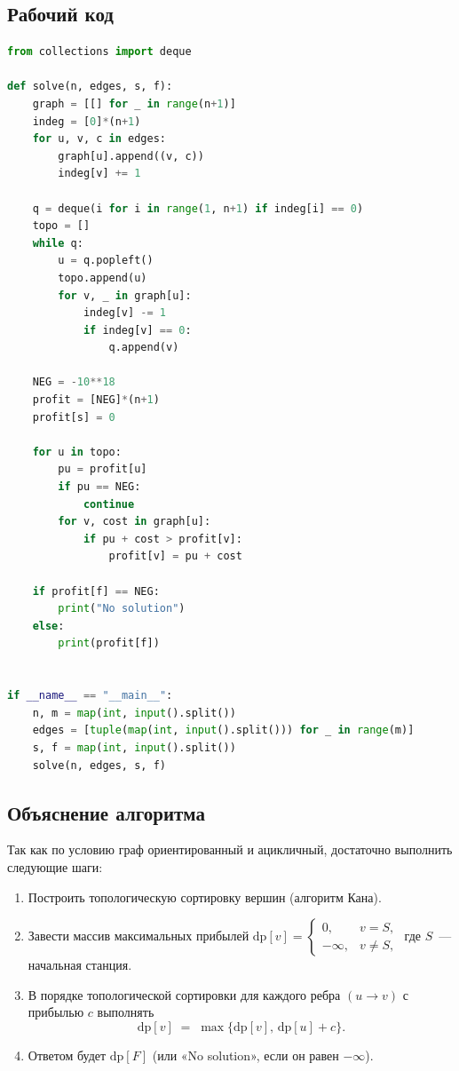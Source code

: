 \documentclass[a4paper,12pt]{article}
\begin{document}
\subsection*{Рабочий код}
\begin{lstlisting}[language=python]
from collections import deque

def solve(n, edges, s, f):
    graph = [[] for _ in range(n+1)]
    indeg = [0]*(n+1)
    for u, v, c in edges:
        graph[u].append((v, c))
        indeg[v] += 1

    q = deque(i for i in range(1, n+1) if indeg[i] == 0)
    topo = []
    while q:
        u = q.popleft()
        topo.append(u)
        for v, _ in graph[u]:
            indeg[v] -= 1
            if indeg[v] == 0:
                q.append(v)

    NEG = -10**18
    profit = [NEG]*(n+1)
    profit[s] = 0

    for u in topo:
        pu = profit[u]
        if pu == NEG:
            continue
        for v, cost in graph[u]:
            if pu + cost > profit[v]:
                profit[v] = pu + cost

    if profit[f] == NEG:
        print("No solution")
    else:
        print(profit[f])


if __name__ == "__main__":
    n, m = map(int, input().split())
    edges = [tuple(map(int, input().split())) for _ in range(m)]
    s, f = map(int, input().split())
    solve(n, edges, s, f)
\end{lstlisting}
\subsection*{Объяснение алгоритма}
Так как по условию граф ориентированный и ацикличный, достаточно выполнить следующие шаги:
\begin{enumerate}
  \item Построить топологическую сортировку вершин (алгоритм Кана).
  \item Завести массив максимальных прибылей 
  \(\displaystyle \mathrm{dp}[v]=\begin{cases}0,&v=S,\\-\infty,&v\ne S,\end{cases}\)
  где \(S\) — начальная станция.
  \item В порядке топологической сортировки для каждого ребра \((u\to v)\) с прибылью \(c\) выполнять
  \[
    \mathrm{dp}[v]\;=\;\max\{\mathrm{dp}[v],\,\mathrm{dp}[u]+c\}.
  \]
  \item Ответом будет \(\mathrm{dp}[F]\) (или «No solution», если он равен \(-\infty\)).
\end{enumerate}
\end{document}
